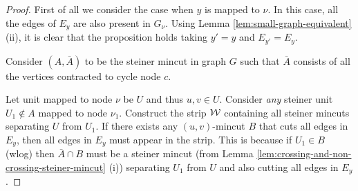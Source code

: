 \begin{proof}
First of all we consider the case when $y$ is mapped to $\nu$. In this case, all the edges of $E_y$ are also present in $G_\nu$. Using Lemma \ref{lem:small-graph-equivalent}(ii), it is clear that the proposition holds taking $y'=y$ and $E_{y'}=E_y$.



Consider $(A,{\bar A})$ to be the steiner mincut in graph $G$ such that ${\bar A}$ consists of all the vertices contracted to cycle node $c$.

Let unit mapped to node $\nu$ be $U$ and thus $u,v\in U$. Consider \textit{any} steiner unit $U_1 \notin A$ mapped to node $\nu_1$. Construct the strip ${\cal W}$ containing all steiner mincuts separating $U$ from $U_1$. If there exists any $(u,v)$-mincut $B$ that cuts all edges in $E_y$, then all edges in $E_y$ must appear in the strip. This is because if $U_1 \in B$ (wlog) then ${\bar A}\cap B$ must be a steiner mincut (from Lemma \ref{lem:crossing-and-non-crossing-steiner-mincut} (i)) separating $U_1$ from $U$ and also cutting all edges in $E_y$.


\end{proof}

